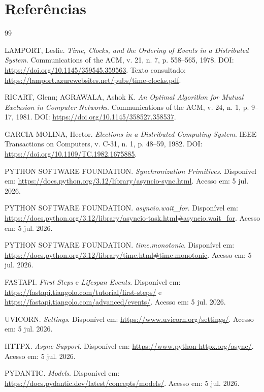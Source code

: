 \clearpage
\section{Referências}

\begin{thebibliography}{99}

LAMPORT, Leslie. \textit{Time, Clocks, and the Ordering of Events in a Distributed System}.
Communications of the ACM, v. 21, n. 7, p. 558--565, 1978.
DOI: \url{https://doi.org/10.1145/359545.359563}.
Texto consultado: \url{https://lamport.azurewebsites.net/pubs/time-clocks.pdf}.

RICART, Glenn; AGRAWALA, Ashok K. \textit{An Optimal Algorithm for Mutual Exclusion in Computer Networks}.
Communications of the ACM, v. 24, n. 1, p. 9--17, 1981.
DOI: \url{https://doi.org/10.1145/358527.358537}.

GARCIA-MOLINA, Hector. \textit{Elections in a Distributed Computing System}.
IEEE Transactions on Computers, v. C-31, n. 1, p. 48--59, 1982.
DOI: \url{https://doi.org/10.1109/TC.1982.1675885}.

PYTHON SOFTWARE FOUNDATION. \textit{Synchronization Primitives}.
Disponível em: \url{https://docs.python.org/3.12/library/asyncio-sync.html}.
Acesso em: 5 jul. 2026.

PYTHON SOFTWARE FOUNDATION. \textit{asyncio.wait\_for}.
Disponível em: \url{https://docs.python.org/3.12/library/asyncio-task.html#asyncio.wait_for}.
Acesso em: 5 jul. 2026.

PYTHON SOFTWARE FOUNDATION. \textit{time.monotonic}.
Disponível em: \url{https://docs.python.org/3.12/library/time.html#time.monotonic}.
Acesso em: 5 jul. 2026.

FASTAPI. \textit{First Steps} e \textit{Lifespan Events}.
Disponível em: \url{https://fastapi.tiangolo.com/tutorial/first-steps/} e
\url{https://fastapi.tiangolo.com/advanced/events/}.
Acesso em: 5 jul. 2026.

UVICORN. \textit{Settings}.
Disponível em: \url{https://www.uvicorn.org/settings/}.
Acesso em: 5 jul. 2026.

HTTPX. \textit{Async Support}.
Disponível em: \url{https://www.python-httpx.org/async/}.
Acesso em: 5 jul. 2026.

PYDANTIC. \textit{Models}.
Disponível em: \url{https://docs.pydantic.dev/latest/concepts/models/}.
Acesso em: 5 jul. 2026.


\end{thebibliography}
